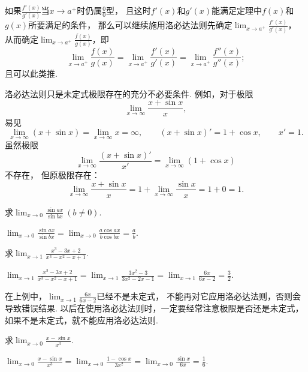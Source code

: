 如果\(\frac{f'(x)}{g'(x)}\)当\(x \to a^+\)时仍属\(\frac{0}{0}\)型，
且这时\(f'(x)\)和\(g'(x)\)能满足定理中\(f(x)\)和\(g(x)\)所要满足的条件，
那么可以继续施用洛必达法则先确定\(\lim_{x \to a^+} \frac{f'(x)}{g'(x)}\)，
从而确定\(\lim_{x \to a^+} \frac{f(x)}{g(x)}\)，即\[
	\lim_{x \to a^+} \frac{f(x)}{g(x)}
	= \lim_{x \to a^+} \frac{f'(x)}{g'(x)}
	= \lim_{x \to a^+} \frac{f''(x)}{g''(x)};
\]
且可以此类推.

洛必达法则只是未定式极限存在的充分不必要条件.
例如，对于极限\[
	\lim_{x\to\infty} \frac{x+\sin x}{x},
\]
易见\[
	\lim_{x\to\infty} (x+\sin x)
	= \lim_{x\to\infty} x
	= \infty,
	\qquad
	(x+\sin x)' = 1+\cos x, \qquad
	x' = 1.
\]
虽然极限\[
	\lim_{x\to\infty}\frac{(x+\sin x)'}{x'} = \lim_{x\to\infty}(1+\cos x)
\]不存在，
但原极限存在：\[
	\lim_{x\to\infty} \frac{x+\sin x}{x}
	= 1 + \lim_{x\to\infty} \frac{\sin x}{x}
	= 1 + 0 = 1.
\]

\begin{example}
求\(\lim_{x\to0} \frac{\sin ax}{\sin bx}\ (b \neq 0)\).
\begin{solution}
\(\lim_{x\to0} \frac{\sin ax}{\sin bx}
= \lim_{x\to0} \frac{a \cos ax}{b \cos bx}
= \frac{a}{b}\).
\end{solution}
\end{example}

\begin{example}
求\(\lim_{x\to1} \frac{x^3-3x+2}{x^3-x^2-x+1}\).
\begin{solution}
\(\lim_{x\to1} \frac{x^3-3x+2}{x^3-x^2-x+1}
= \lim_{x\to1} \frac{3x^2-3}{3x^2-2x-1}
= \lim_{x\to1} \frac{6x}{6x-2}
= \frac32\).
\end{solution}
\end{example}

\begin{remark}
在上例中，\(\lim_{x\to1} \frac{6x}{6x-2}\)已经不是未定式，
不能再对它应用洛必达法则，否则会导致错误结果.
以后在使用洛必达法则时，一定要经常注意极限是否还是未定式，
如果不是未定式，就不能应用洛必达法则.
\end{remark}

\begin{example}
求\(\lim_{x\to0} \frac{x-\sin x}{x^3}\).
\begin{solution}
\(\lim_{x\to0} \frac{x-\sin x}{x^3}
= \lim_{x\to0} \frac{1-\cos x}{3x^2}
= \lim_{x\to0} \frac{\sin x}{6x}
= \frac16\).
\end{solution}
\end{example}

